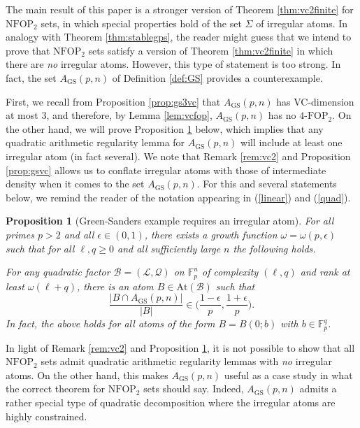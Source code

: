 \documentclass[12pt,oneside,british,a4wide]{amsart}
\newtheorem{proposition}[theorem]{Proposition}
\numberwithin{equation}{section}
\theoremstyle{definition}
\def\F{\mathbb{F}}
\def\FOP{\mathrm{FOP}}
\def\NFOP{\mathrm{NFOP}}
\def\GS{\mathrm{GS}}
\def\e{\epsilon}
\newcommand{\calL}{\mathcal{L}}
\newcommand{\calB}{\mathcal{B}}
\newcommand{\calQ}{\mathcal{Q}}
\newcommand{\At}{{\mathrm{At}}}
\begin{document}
 The main result of this paper is a stronger version of Theorem \ref{thm:vc2finite} for $\NFOP_2$ sets, in which special properties hold of the set $\Sigma$ of irregular atoms. In analogy with Theorem \ref{thm:stablegps}, the reader might guess that we intend to prove that $\NFOP_2$ sets satisfy a version of Theorem \ref{thm:vc2finite} in which there are \emph{no} irregular atoms.  However,  this type of statement is too strong. In fact, the set $A_{\GS}(p,n)$ of Definition \ref{def:GS} provides a counterexample.  
 
 First, we recall from Proposition \ref{prop:gs3vc} that $A_{\GS}(p,n)$ has VC-dimension at most $3$, and therefore, by Lemma \ref{lem:vcfop}, $A_{\GS}(p,n)$ has no $4$-$\FOP_2$. On the other hand, we will prove Proposition \ref{prop:gslinear} below, which implies that any quadratic arithmetic regularity lemma for $A_{\GS}(p,n)$ will include at least one  irregular atom (in fact several).   We note that Remark \ref{rem:vc2} and Proposition \ref{prop:gsvc} allows us to conflate irregular atoms with those of intermediate density when it comes to the set $A_{\GS}(p,n)$. For this and several statements below, we remind the reader of the notation appearing in (\ref{linear}) and (\ref{quad}).


\begin{proposition}[Green-Sanders example requires an irregular atom]\label{prop:gslinear}
For all primes $p>2$ and all $\e\in (0,1)$, there exists a growth function $\omega=\omega(p,\e)$ such that for all $\ell,q\geq 0$ and all sufficiently large $n$ the following holds. 

For  any quadratic factor $\calB=(\calL,\calQ)$ on $\mathbb{F}_p^n$ of complexity $(\ell,q)$ and rank at least $\omega(\ell+q)$, there is an atom $B\in \At(\calB)$ such that 
$$
\frac{|B\cap A_{\GS}(p,n)|}{|B|}\in \Big(\frac{1-\e}{p},\frac{1+\e}{p}\Big).  
$$
In fact, the above holds for all atoms of the form $B=B(0;b)$ with $b\in \F_p^q$.  
\end{proposition}

In light of Remark \ref{rem:vc2} and Proposition \ref{prop:gslinear},  it is not possible to show that all $\NFOP_2$ sets admit quadratic arithmetic regularity lemmas with  \emph{no} irregular atoms.  On the other hand, this makes $A_{\GS}(p,n)$ useful as a case study in what the correct theorem for $\NFOP_2$ sets should say.  Indeed, $A_{\GS}(p,n)$ admits a rather special type of quadratic decomposition where the irregular atoms are highly constrained.   
\end{document}
